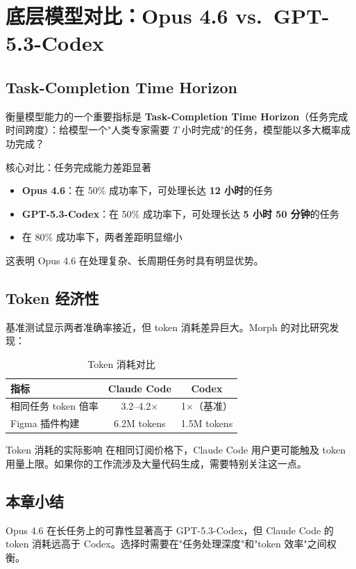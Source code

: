 \section{底层模型对比：Opus 4.6 vs.\ GPT-5.3-Codex}

\subsection{Task-Completion Time Horizon}

衡量模型能力的一个重要指标是 \textbf{Task-Completion Time Horizon}（任务完成时间跨度）：给模型一个"人类专家需要 $T$ 小时完成"的任务，模型能以多大概率成功完成？

\begin{importantbox}{核心对比：任务完成能力差距显著}
\begin{itemize}
    \item \textbf{Opus 4.6}：在 50\% 成功率下，可处理长达 \textbf{12 小时}的任务
    \item \textbf{GPT-5.3-Codex}：在 50\% 成功率下，可处理长达 \textbf{5 小时 50 分钟}的任务
    \item 在 80\% 成功率下，两者差距明显缩小
\end{itemize}
这表明 Opus 4.6 在处理复杂、长周期任务时具有明显优势。
\end{importantbox}

\subsection{Token 经济性}

基准测试显示两者准确率接近，但 token 消耗差异巨大。Morph 的对比研究发现：

\begin{table}[H]
\centering
\caption{Token 消耗对比}
\begin{tabular}{lcc}
\toprule
\textbf{指标} & \textbf{Claude Code} & \textbf{Codex} \\
\midrule
相同任务 token 倍率 & 3.2--4.2$\times$ & 1$\times$（基准） \\
Figma 插件构建 & 6.2M tokens & 1.5M tokens \\
\bottomrule
\end{tabular}
\end{table}

\begin{warningbox}{Token 消耗的实际影响}
在相同订阅价格下，Claude Code 用户更可能触及 token 用量上限。如果你的工作流涉及大量代码生成，需要特别关注这一点。
\end{warningbox}

\subsection{本章小结}

Opus 4.6 在长任务上的可靠性显著高于 GPT-5.3-Codex，但 Claude Code 的 token 消耗远高于 Codex。选择时需要在"任务处理深度"和"token 效率"之间权衡。

